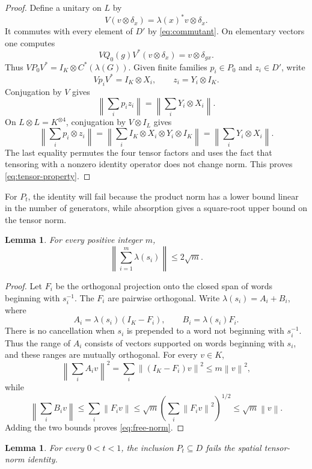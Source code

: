 \documentclass[11pt]{article}
\newtheorem{lemma}[theorem]{Lemma}
\theoremstyle{definition}
\theoremstyle{remark}
\newcommand{\id}{I}
\newcommand{\norm}[1]{\left\|#1\right\|}
\begin{document}
\begin{proof}
Define a unitary on $L$ by
\[
V(v\otimes\delta_x)=\lambda(x)^*v\otimes\delta_x.
\]
It commutes with every element of $D'$ by \eqref{eq:commutant}.
On elementary vectors one computes
\[
VQ_0(g)V^*(v\otimes\delta_x)=v\otimes\delta_{gx}.
\]
Thus $VP_0V^*=\id_K\otimes C^*(\lambda(G))$.
Given finite families $p_i\in P_0$ and $z_i\in D'$, write
\[
Vp_iV^*=\id_K\otimes X_i,\qquad z_i=Y_i\otimes\id_K.
\]
Conjugation by $V$ gives
\[
\norm{\sum_i p_i z_i}=\norm{\sum_i Y_i\otimes X_i}.
\]
On $L\otimes L=K^{\otimes4}$, conjugation by $V\otimes\id_L$ gives
\[
\norm{\sum_i p_i\otimes z_i}
=\norm{\sum_i\id_K\otimes X_i\otimes Y_i\otimes\id_K}
=\norm{\sum_iY_i\otimes X_i}.
\]
The last equality permutes the four tensor factors and uses the fact
that tensoring with a nonzero identity operator does not change norm.
This proves \eqref{eq:tensor-property}.
\end{proof}

For $P_t$, the identity will fail because the product norm has a lower
bound linear in the number of generators, while absorption gives a
square-root upper bound on the tensor norm.

\begin{lemma}\label{lem:free-norm}
For every positive integer $m$,
\begin{equation}\label{eq:free-norm}
\norm{\sum_{i=1}^m\lambda(s_i)}\le2\sqrt m.
\end{equation}
\end{lemma}

\begin{proof}
Let $F_i$ be the orthogonal projection onto the closed span of words beginning
with $s_i^{-1}$. The $F_i$ are pairwise orthogonal. Write
$\lambda(s_i)=A_i+B_i$, where
\[
A_i=\lambda(s_i)(\id_K-F_i),\qquad B_i=\lambda(s_i)F_i.
\]
There is no cancellation when $s_i$ is prepended to a word not beginning
with $s_i^{-1}$. Thus the range of $A_i$ consists of vectors supported on
words beginning with $s_i$, and these ranges are mutually orthogonal.
For every $v\in K$,
\[
\norm{\sum_i A_iv}^2=\sum_i\norm{(\id_K-F_i)v}^2
\le m\norm{v}^2,
\]
while
\[
\norm{\sum_i B_iv}\le\sum_i\norm{F_iv}
\le\sqrt m\left(\sum_i\norm{F_iv}^2\right)^{1/2}
\le\sqrt m\norm{v}.
\]
Adding the two bounds proves \eqref{eq:free-norm}.
\end{proof}

\begin{lemma}\label{lem:bad-inclusion}
For every $0<t<1$, the inclusion $P_t\subseteq D$
fails the spatial tensor-norm identity.
\end{lemma}
\end{document}
